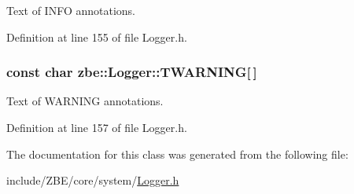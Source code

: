 Text of I\+N\+F\+O annotations. 



Definition at line 155 of file Logger.\+h.

\hypertarget{classzbe_1_1_logger_a9dbd65ebc9452231ee1a0adaa3c08d93}{}
\subsubsection[{T\+W\+A\+R\+N\+I\+N\+G}]{\setlength{\rightskip}{0pt plus 5cm}const char zbe\+::\+Logger\+::\+T\+W\+A\+R\+N\+I\+N\+G\mbox{[}$\,$\mbox{]}\hspace{0.3cm}{\ttfamily [static]}}\label{classzbe_1_1_logger_a9dbd65ebc9452231ee1a0adaa3c08d93}


Text of W\+A\+R\+N\+I\+N\+G annotations. 



Definition at line 157 of file Logger.\+h.



The documentation for this class was generated from the following file\+:\begin{DoxyCompactItemize}
\item 
include/\+Z\+B\+E/core/system/\hyperlink{_logger_8h}{Logger.\+h}\end{DoxyCompactItemize}
